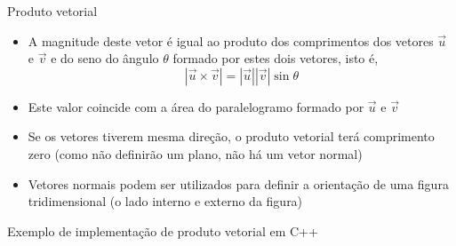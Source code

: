 \begin{frame}[fragile]{Produto vetorial}

    \begin{itemize}
        \item A magnitude deste vetor é igual ao produto dos comprimentos dos vetores $\vec{u}$ e 
            $\vec{v}$ e do seno do ângulo $\theta$ formado por estes dois vetores, isto é,
        \[
            |\vec{u}\times \vec{v}| = |\vec{u}||\vec{v}|\sin \theta
        \]
        \pause

        \item Este valor coincide com a área do paralelogramo formado por $\vec{u}$ e $\vec{v}$
        \pause

        \item Se os vetores tiverem mesma direção, o produto vetorial terá comprimento zero (como não definirão um plano, não há um vetor normal)
        \pause

        \item Vetores normais podem ser utilizados para definir a orientação de uma figura tridimensional (o lado interno e externo da figura)
    \end{itemize}

\end{frame}

\begin{frame}[fragile]{Exemplo de implementação de produto vetorial em C++}
\end{frame}
